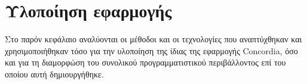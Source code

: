 \chapter{Υλοποίηση εφαρμογής}\label{chapter:4-application-implementation}

Στο παρόν κεφάλαιο αναλύονται οι μέθοδοι και οι τεχνολογίες που αναπτύχθηκαν και χρησιμοποιήθηκαν τόσο για την υλοποίηση της ίδιας της εφαρμογής Concordia, όσο και για τη διαμορφώση του συνολικού προγραμματιστικού περιβάλλοντος επί του οποίου αυτή δημιουργήθηκε.






